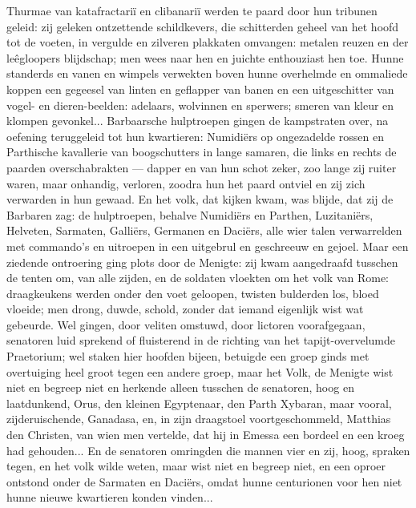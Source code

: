 \documentclass[a4paper, 12pt, oneside, dutch]{article}
\begin{document}
Thurmae van katafractariï en clibanariï werden te paard door hun tribunen geleid: zij geleken ontzettende schildkevers, die schitterden geheel van het hoofd tot de voeten, in vergulde en zilveren plakkaten omvangen: metalen reuzen en der leêgloopers blijdschap; men wees naar hen en juichte enthouziast hen toe. Hunne standerds en vanen en wimpels verwekten boven hunne overhelmde en ommaliede koppen een gegeesel van linten en geflapper van banen en een uitgeschitter van vogel- en dieren-beelden: adelaars, wolvinnen en sperwers; smeren van kleur en klompen gevonkel... Barbaarsche hulptroepen gingen de kampstraten over, na oefening teruggeleid tot hun kwartieren: Numidiërs op ongezadelde rossen en Parthische kavallerie van boogschutters in lange samaren, die links en rechts de paarden overschabrakten --- dapper en van hun schot zeker, zoo lange zij ruiter waren, maar onhandig, verloren, zoodra hun het paard ontviel en zij zich verwarden in hun gewaad. En het volk, dat kijken kwam, was blijde, dat zij de Barbaren zag: de hulptroepen, behalve Numidiërs en Parthen, Luzitaniërs, Helveten, Sarmaten, Galliërs, Germanen en Daciërs, alle wier talen verwarrelden met commando's en uitroepen in een uitgebrul en geschreeuw en gejoel. Maar een ziedende ontroering ging plots door de Menigte: zij kwam aangedraafd tusschen de tenten om, van alle zijden, en de soldaten vloekten om het volk van Rome: draagkeukens werden onder den voet geloopen, twisten bulderden los, bloed vloeide; men drong, duwde, schold, zonder dat iemand eigenlijk wist wat gebeurde. Wel gingen, door veliten omstuwd, door lictoren voorafgegaan, senatoren luid sprekend of fluisterend in de richting van het tapijt-overvelumde Praetorium; wel staken hier hoofden bijeen, betuigde een groep ginds met overtuiging heel groot tegen een andere groep, maar het Volk, de Menigte wist niet en begreep niet en herkende alleen tusschen de senatoren, hoog en laatdunkend, Orus, den kleinen Egyptenaar, den Parth Xybaran, maar vooral, zijderuischende, Ganadasa, en, in zijn draagstoel voortgeschommeld, Matthias den Christen, van wien men vertelde, dat hij in Emessa een bordeel en een kroeg had gehouden... En de senatoren omringden die mannen vier en zij, hoog, spraken tegen, en het volk wilde weten, maar wist niet en begreep niet, en een oproer ontstond onder de Sarmaten en Daciërs, omdat hunne centurionen voor hen niet hunne nieuwe kwartieren konden vinden...
\end{document}
